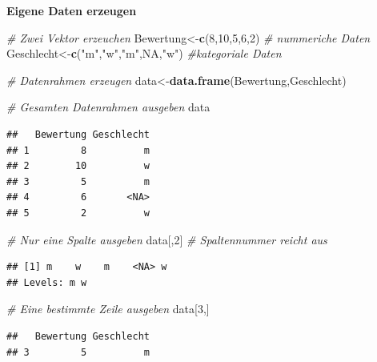 \documentclass[10pt,ngerman,onside]{article}
\newenvironment{Shaded}{\begin{snugshade}}{\end{snugshade}}
\newcommand{\KeywordTok}[1]{\textcolor[rgb]{0.13,0.29,0.53}{\textbf{#1}}}
\newcommand{\DecValTok}[1]{\textcolor[rgb]{0.00,0.00,0.81}{#1}}
\newcommand{\StringTok}[1]{\textcolor[rgb]{0.31,0.60,0.02}{#1}}
\newcommand{\CommentTok}[1]{\textcolor[rgb]{0.56,0.35,0.01}{\textit{#1}}}
\newcommand{\OtherTok}[1]{\textcolor[rgb]{0.56,0.35,0.01}{#1}}
\newcommand{\OperatorTok}[1]{\textcolor[rgb]{0.81,0.36,0.00}{\textbf{#1}}}
\newcommand{\NormalTok}[1]{#1}
\begin{document}
\textbf{Eigene Daten erzeugen}

\begin{Shaded}
\begin{Highlighting}[]
\CommentTok{# Zwei Vektor erzeuchen}
\NormalTok{Bewertung<-}\KeywordTok{c}\NormalTok{(}\DecValTok{8}\NormalTok{,}\DecValTok{10}\NormalTok{,}\DecValTok{5}\NormalTok{,}\DecValTok{6}\NormalTok{,}\DecValTok{2}\NormalTok{) }\CommentTok{# nummeriche Daten}
\NormalTok{Geschlecht<-}\KeywordTok{c}\NormalTok{(}\StringTok{"m"}\NormalTok{,}\StringTok{"w"}\NormalTok{,}\StringTok{"m"}\NormalTok{,}\OtherTok{NA}\NormalTok{,}\StringTok{"w"}\NormalTok{) }\CommentTok{#kategoriale Daten}

\CommentTok{# Datenrahmen erzeugen}
\NormalTok{data<-}\KeywordTok{data.frame}\NormalTok{(Bewertung,Geschlecht)}

\CommentTok{# Gesamten Datenrahmen ausgeben}
\NormalTok{data}
\end{Highlighting}
\end{Shaded}

\begin{verbatim}
##   Bewertung Geschlecht
## 1         8          m
## 2        10          w
## 3         5          m
## 4         6       <NA>
## 5         2          w
\end{verbatim}

\begin{Shaded}
\begin{Highlighting}[]
\CommentTok{# Nur eine Spalte ausgeben}
\NormalTok{data[,}\DecValTok{2}\NormalTok{] }\CommentTok{# Spaltennummer reicht aus}
\end{Highlighting}
\end{Shaded}

\begin{verbatim}
## [1] m    w    m    <NA> w   
## Levels: m w
\end{verbatim}

\begin{Shaded}
\begin{Highlighting}[]
\CommentTok{# Eine bestimmte Zeile ausgeben}
\NormalTok{data[}\DecValTok{3}\NormalTok{,]}
\end{Highlighting}
\end{Shaded}

\begin{verbatim}
##   Bewertung Geschlecht
## 3         5          m
\end{verbatim}

\begin{Shaded}
\end{Shaded}
\end{document}
